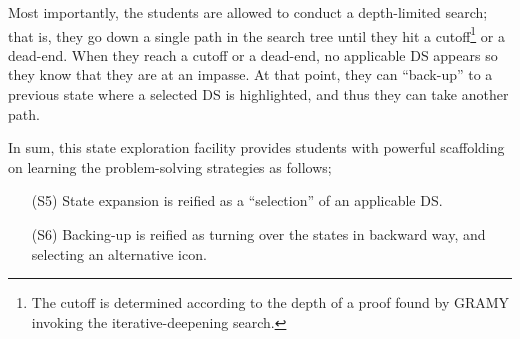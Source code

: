 Most importantly, the students are allowed to conduct a depth-limited
search; that is, they go down a single path in the search tree until
they hit a cutoff\footnote{The cutoff is determined according to the
depth of a proof found by GRAMY invoking the iterative-deepening
search.} or a dead-end.  When they reach a cutoff or a dead-end, no
applicable DS appears so they know that they are at an impasse.  At that
point, they can ``back-up'' to a previous state where a selected DS is
highlighted, and thus they can take another path.

In sum, this state exploration facility provides students with powerful
scaffolding on learning the problem-solving strategies as follows;

\begin{itemize}
 \item [(S5)] State expansion is reified as a ``selection'' of an
       applicable DS.  
 \item [(S6)] Backing-up is reified as turning over the states in
       backward way, and selecting an alternative icon.
\end{itemize}

